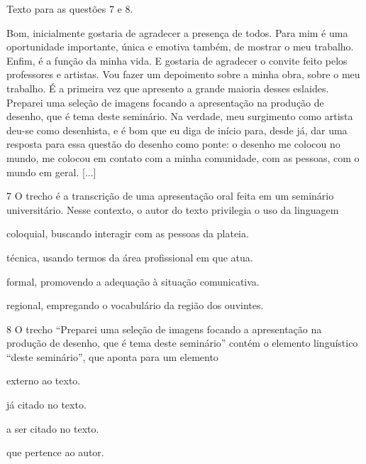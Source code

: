 \pagebreak

Texto para as questões 7 e 8.

\begin{myquote}
Bom, inicialmente gostaria de agradecer a presença de todos. Para mim é
uma oportunidade importante, única e emotiva também, de mostrar o meu
trabalho. Enfim, é a função da minha vida. E gostaria de agradecer o
convite feito pelos professores e artistas. Vou fazer um depoimento
sobre a minha obra, sobre o meu trabalho. É a primeira vez que apresento
a grande maioria desses eslaides. Preparei uma seleção de imagens
focando a apresentação na produção de desenho, que é tema deste
seminário. Na verdade, meu surgimento como artista deu-se como
desenhista, e é bom que eu diga de início para, desde já, dar uma
resposta para essa questão do desenho como ponte: o desenho me colocou
no mundo, me colocou em contato com a minha comunidade, com as pessoas,
com o mundo em geral. {[}...{]}

\end{myquote}

\num{7} O trecho é a transcrição de uma apresentação oral feita em um seminário
universitário. Nesse contexto, o autor do texto privilegia o uso da linguagem

\begin{escolha}
\item
  coloquial, buscando interagir com as pessoas da plateia.
\item
  técnica, usando termos da área profissional em que atua.
\item
  formal, promovendo a adequação à situação comunicativa.
\item
  regional, empregando o vocabulário da região dos ouvintes.
\end{escolha}

\num{8} O trecho ``Preparei uma seleção de imagens focando a apresentação na
produção de desenho, que é tema deste seminário'' contém o elemento
linguístico ``deste seminário'', que aponta para um elemento

\begin{escolha}
\item externo ao texto.

\item já citado no texto.

\item a ser citado no texto.

\item que pertence ao autor.
\end{escolha}

